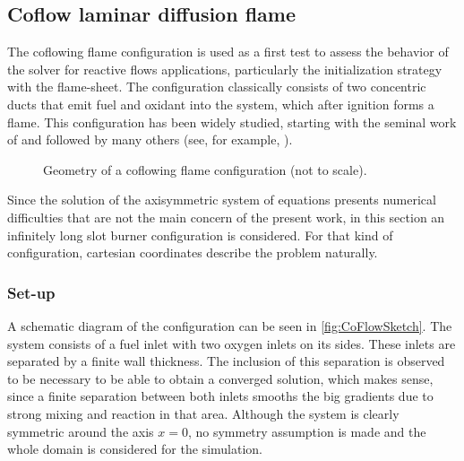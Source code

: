 \subsection{Coflow laminar diffusion flame}\label{ssec:coflowFlame}
The coflowing flame configuration is used as a first test to assess the behavior of the solver for reactive flows applications, particularly the initialization strategy with the flame-sheet. The configuration classically consists of two concentric ducts that emit fuel and oxidant into the system, which after ignition forms a flame. This configuration has been widely studied, starting with the seminal work of \textcite{burkeDiffusionFlames1928} and followed by many others (see, for example, \textcite{smookeNumericalModelingAxisymmetric1992, smookeNumericalSolutionTwoDimensional1986,braackAdaptiveFiniteElement1997}).
\begin{figure}[t]
	\centering
	\def\svgwidth{0.38\textwidth}
	\qquad\quad
	\def\svgwidth{0.35\textwidth}
	\caption{Geometry of a coflowing flame configuration (not to scale).} \label{fig:CoFlowGeometry}
\end{figure}
Since the solution of the axisymmetric system of equations presents numerical difficulties that are not the main concern of the present work, in this section an infinitely long slot burner configuration is considered. For that kind of configuration, cartesian coordinates describe the problem naturally. 
\subsubsection{Set-up}
A schematic diagram of the configuration can be seen in \cref{fig:CoFlowSketch}. The system consists of a fuel inlet with two oxygen inlets on its sides. These inlets are separated by a finite wall thickness. The inclusion of this separation is observed to be necessary to be able to obtain a converged solution, which makes sense, since a finite separation between both inlets smooths the big gradients due to strong mixing and reaction in that area. Although the system is clearly symmetric around the axis $x = 0$, no symmetry assumption is made and the whole domain is considered for the simulation.

